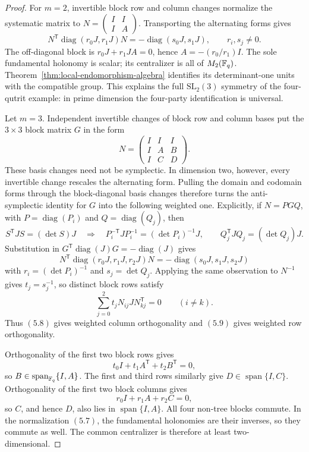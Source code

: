 \begin{proof}
For \(m=2\), invertible block row and column changes normalize the
systematic matrix to \(N=\left(\begin{smallmatrix}I&I\\I&A\end{smallmatrix}\right)\).
Transporting the alternating forms gives
\[
 N^{\mathsf T}\operatorname{diag}(r_0J,r_1J)N
 =-\operatorname{diag}(s_0J,s_1J),
 \qquad r_i,s_j\ne0.
\]
The off-diagonal block is \(r_0J+r_1JA=0\), hence
\(A=-(r_0/r_1)I\).  The sole fundamental holonomy is scalar; its
centralizer is all of \(M_2(\mathbb F_q)\).  Theorem~\ref{thm:local-endomorphism-algebra}
identifies its determinant-one units with the compatible group.
This explains the full \(\mathrm{SL}_2(3)\) symmetry of the four-qutrit
example: in prime dimension the four-party identification is universal.

Let \(m=3\).  Independent invertible changes of block row and column bases
put the \(3\times3\) block matrix \(G\) in the form
\[
 N=\begin{pmatrix}
 I&I&I\\ I&A&B\\ I&C&D
 \end{pmatrix}.                                      \tag{5.7}
\]
These basis changes need not be symplectic.  In dimension two, however,
every invertible change rescales the alternating form.  Pulling the domain
and codomain forms through the block-diagonal basis changes therefore turns
the anti-symplectic identity for \(G\) into the following weighted one.
Explicitly, if \(N=PGQ\), with \(P=\operatorname{diag}(P_i)\) and
\(Q=\operatorname{diag}(Q_j)\), then
\[
 S^{\mathsf T}JS=(\det S)J
 \quad\Longrightarrow\quad
 P_i^{-\mathsf T}JP_i^{-1}=(\det P_i)^{-1}J,
 \qquad Q_j^{\mathsf T}JQ_j=(\det Q_j)J.
\]
Substitution in \(G^{\mathsf T}\operatorname{diag}(J)G
=-\operatorname{diag}(J)\) gives
\[
 N^{\mathsf T}\operatorname{diag}(r_0J,r_1J,r_2J)N
   =-\operatorname{diag}(s_0J,s_1J,s_2J)              \tag{5.8}
\]
with \(r_i=(\det P_i)^{-1}\) and \(s_j=\det Q_j\).  Applying the same
observation to \(N^{-1}\) gives \(t_j=s_j^{-1}\), so distinct block rows
satisfy
\[
 \sum_{j=0}^2t_jN_{ij}JN_{kj}^{\mathsf T}=0
 \qquad(i\ne k).                                     \tag{5.9}
\]
Thus \((5.8)\) gives weighted column orthogonality and \((5.9)\) gives
weighted row orthogonality.

Orthogonality of the first two block rows gives
\[
 t_0I+t_1A^{\mathsf T}+t_2B^{\mathsf T}=0,
\]
so \(B\in\operatorname{span}_{\mathbb F_q}\{I,A\}\).  The first and third rows
similarly give \(D\in\operatorname{span}\{I,C\}\).  Orthogonality of the
first two block columns gives
\[
 r_0I+r_1A+r_2C=0,
\]
so \(C\), and hence \(D\), also lies in
\(\operatorname{span}\{I,A\}\).  All four non-tree blocks commute.  In
the normalization \((5.7)\), the fundamental holonomies are their inverses,
so they commute as well.  The common centralizer is therefore at least
two-dimensional.


\end{proof}
